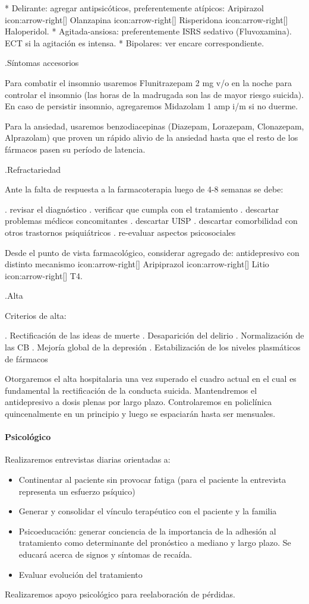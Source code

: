 \documentclass{scrbook}
\begin{document}
* Delirante: agregar antipsicóticos, preferentemente atípicos: Aripirazol icon:arrow-right[] Olanzapina icon:arrow-right[] Risperidona icon:arrow-right[] Haloperidol.
* Agitada-ansiosa: preferentemente ISRS sedativo (Fluvoxamina). ECT si la agitación es intensa.
* Bipolares: ver encare correspondiente.

.Síntomas accesorios

Para combatir el insomnio usaremos Flunitrazepam 2 mg v/o en la noche para controlar el insomnio (las horas de la madrugada son las de mayor riesgo suicida). En caso de persistir insomnio, agregaremos Midazolam 1 amp i/m si no duerme.

Para la ansiedad, usaremos benzodiacepinas (Diazepam, Lorazepam, Clonazepam, Alprazolam) que proven un rápido alivio de la ansiedad hasta que el resto de los fármacos pasen su período de latencia.

.Refractariedad

Ante la falta de respuesta a la farmacoterapia luego de 4-8 semanas se debe:

. revisar el diagnóstico
. verificar que cumpla con el tratamiento
. descartar problemas médicos concomitantes
. descartar UISP
. descartar comorbilidad con otros trastornos psiquiátricos
. re-evaluar aspectos psicosociales

Desde el punto de vista farmacológico, considerar agregado de: antidepresivo con distinto mecanismo icon:arrow-right[] Aripiprazol icon:arrow-right[] Litio icon:arrow-right[] T4.

.Alta

Criterios de alta:

. Rectificación de las ideas de muerte
. Desaparición del delirio
. Normalización de las CB
. Mejoría global de la depresión
. Estabilización de los niveles plasmáticos de fármacos

Otorgaremos el alta hospitalaria una vez superado el cuadro actual en el cual es fundamental la rectificación de la conducta suicida. Mantendremos el antidepresivo a dosis plenas por largo plazo. Controlaremos en policlínica quincenalmente en un principio y luego se espaciarán hasta ser mensuales.
\paragraph{Psicológico}
Realizaremos entrevistas diarias orientadas a:

\begin{itemize}
	\item Continentar al paciente sin provocar fatiga (para el paciente la entrevista representa un esfuerzo psíquico)
	\item Generar y consolidar el vínculo terapéutico con el paciente y la familia
	\item Psicoeducación: generar conciencia de la importancia de la adhesión al tratamiento como determinante del pronóstico a mediano y largo plazo. Se educará acerca de signos y síntomas de recaída.
	\item Evaluar evolución del tratamiento
\end{itemize}
Realizaremos apoyo psicológico para reelaboración de pérdidas.
\end{document}
